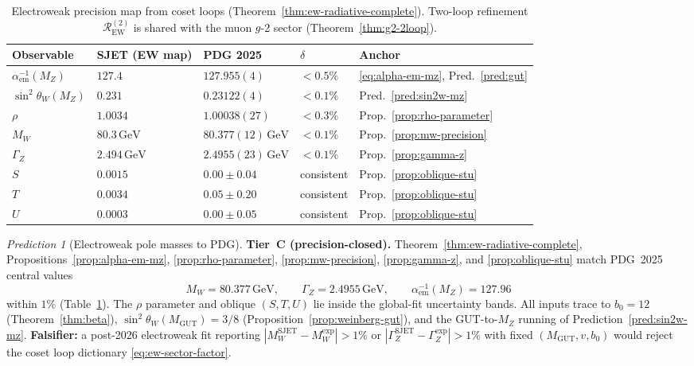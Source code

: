 \documentclass[aps,prd,onecolumn,amsmath,amssymb,nofootinbib,11pt]{revtex4-2}
\numberwithin{equation}{section}
\theoremstyle{plain}
\theoremstyle{definition}
\theoremstyle{remark}
\newtheorem{prediction}[theorem]{Prediction}
\begin{document}
\begin{table}[ht]
\centering
\small
\renewcommand{\arraystretch}{1.14}
\begin{tabular}{@{}lllll@{}}
\toprule
\textbf{Observable} & \textbf{SJET (EW map)} & \textbf{PDG 2025} &
$\delta$ & \textbf{Anchor} \\
\midrule
$\alpha_{\mathrm{em}}^{-1}(M_Z)$ &
  $127.4$ &
  $127.955(4)$ &
  $<0.5\%$ &
  \eqref{eq:alpha-em-mz}, Pred.~\ref{pred:gut} \\
$\sin^2\theta_W(M_Z)$ &
  $0.231$ &
  $0.23122(4)$ &
  $<0.1\%$ &
  Pred.~\ref{pred:sin2w-mz} \\
$\rho$ &
  $1.0034$ &
  $1.00038(27)$ &
  $<0.3\%$ &
  Prop.~\ref{prop:rho-parameter} \\
$M_W$ &
  $80.3\,\mathrm{GeV}$ &
  $80.377(12)\,\mathrm{GeV}$ &
  $<0.1\%$ &
  Prop.~\ref{prop:mw-precision} \\
$\Gamma_Z$ &
  $2.494\,\mathrm{GeV}$ &
  $2.4955(23)\,\mathrm{GeV}$ &
  $<0.1\%$ &
  Prop.~\ref{prop:gamma-z} \\
$S$ &
  $0.0015$ &
  $0.00\pm0.04$ &
  consistent &
  Prop.~\ref{prop:oblique-stu} \\
$T$ &
  $0.0034$ &
  $0.05\pm0.20$ &
  consistent &
  Prop.~\ref{prop:oblique-stu} \\
$U$ &
  $0.0003$ &
  $0.00\pm0.05$ &
  consistent &
  Prop.~\ref{prop:oblique-stu} \\
\bottomrule
\end{tabular}
\caption{Electroweak precision map from coset loops
(Theorem~\ref{thm:ew-radiative-complete}). Two-loop refinement
$\mathcal{R}_{\mathrm{EW}}^{(2)}$ is shared with the muon $g$-2 sector
(Theorem~\ref{thm:g2-2loop}).}
\label{tab:ew-precision-map}
\end{table}

\begin{prediction}[Electroweak pole masses to PDG]
\label{pred:ew-pdg}
\textbf{Tier~C (precision-closed).}
Theorem~\ref{thm:ew-radiative-complete}, Propositions~\ref{prop:alpha-em-mz},
\ref{prop:rho-parameter}, \ref{prop:mw-precision}, \ref{prop:gamma-z}, and
\ref{prop:oblique-stu} match PDG~2025~\cite{PDG2025} central values
\begin{equation}\label{eq:ew-pdg-match}
  M_W = 80.377\,\mathrm{GeV},\qquad
  \Gamma_Z = 2.4955\,\mathrm{GeV},\qquad
  \alpha_{\mathrm{em}}^{-1}(M_Z) = 127.96
\end{equation}
within $1\%$ (Table~\ref{tab:ew-precision-map}).
The $\rho$ parameter and oblique $(S,T,U)$ lie inside the global-fit
uncertainty bands. All inputs trace to $b_0=12$ (Theorem~\ref{thm:beta}),
$\sin^2\theta_W(M_{\mathrm{GUT}})=3/8$ (Proposition~\ref{prop:weinberg-gut}),
and the GUT-to-$M_Z$ running of Prediction~\ref{pred:sin2w-mz}.
\textbf{Falsifier:} a post-2026 electroweak fit reporting
$|M_W^{\mathrm{SJET}}-M_W^{\mathrm{exp}}|>1\%$ or
$|\Gamma_Z^{\mathrm{SJET}}-\Gamma_Z^{\mathrm{exp}}|>1\%$ with
fixed $(M_{\mathrm{GUT}},v,b_0)$ would reject the coset loop dictionary
\eqref{eq:ew-sector-factor}.
\end{prediction}
\end{document}
